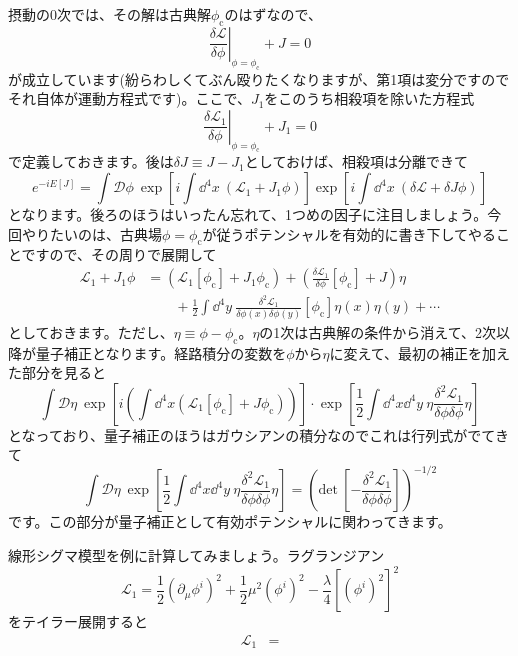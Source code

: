 \documentclass[unicode,a4paper,11pt]{ltjsarticle}
\theoremstyle{definition}
\begin{document}
摂動の0次では、その解は古典解$\phi_{\mathrm{c}}$のはずなので、
\begin{equation}
   \left.
   \frac{\delta\mathcal{L}}{\delta\phi}
   \right|_{\phi=\phi_{\mathrm{c}}}
   +
   J
   =
   0
\end{equation}
が成立しています(紛らわしくてぶん殴りたくなりますが、第1項は変分ですのでそれ自体が運動方程式です)。ここで、$J_{1}$をこのうち相殺項を除いた方程式
\begin{equation}
   \left.
   \frac{\delta\mathcal{L}_1}{\delta\phi}
   \right|_{\phi=\phi_{\mathrm{c}}}
   +
   J_{1}
   =
   0
\end{equation}
で定義しておきます。後は$\delta J\equiv J-J_{1}$としておけば、相殺項は分離できて
\begin{equation}
   e^{-i E[J]}
   =
   \int\mathcal{D}\phi\
   \exp
   \left[
   i\int\dd^4 x\
   (\mathcal{L}_{1}+J_{1}\phi)
   \right]
   \exp
   \left[
      i\int\dd^4 x\
      (\delta\mathcal{L}+\delta J\phi)
      \right]
\end{equation}
となります。後ろのほうはいったん忘れて、1つめの因子に注目しましょう。今回やりたいのは、古典場$\phi=\phi_{\mathrm{c}}$が従うポテンシャルを有効的に書き下してやることですので、その周りで展開して
\begin{align}
   \mathcal{L}_{1}+J_{1}\phi
    & =
   \left(
   \mathcal{L}_{1}[\phi_{\mathrm{c}}]+J_{1}\phi_{\mathrm{c}}
   \right)
   +
   \left(
   \frac{\delta\mathcal{L}_{1}}{\delta\phi}[\phi_{\mathrm{c}}]
   +
   J
   \right)\eta
   \nonumber
   \\
    & \qquad
   +
   \frac{1}{2}\int\dd^4 y\
   \frac{\delta^2 \mathcal{L}_1}{\delta\phi(x)\delta\phi(y)}[\phi_{\mathrm{c}}]\eta(x)\eta(y)
   +
   \cdots
\end{align}
としておきます。ただし、$\eta\equiv\phi-\phi_{\mathrm{c}}$。$\eta$の1次は古典解の条件から消えて、2次以降が量子補正となります。経路積分の変数を$\phi$から$\eta$に変えて、最初の補正を加えた部分を見ると
\begin{equation}
   \int\mathcal{D}\eta\ 
   \exp
   \left[  
      i
      \left(  
         \int\dd^4 x (\mathcal{L}_{1}[\phi_{\mathrm{c}}]+J\phi_{\mathrm{c}})
      \right)
   \right]
   \cdot
   \exp
   \left[  
      \frac{1}{2}
      \int\dd^4 x\dd^4 y\ 
      \eta\frac{\delta^2\mathcal{L}_{1}}{\delta\phi\delta\phi}\eta
   \right]
\end{equation}
となっており、量子補正のほうはガウシアンの積分なのでこれは行列式がでてきて
\begin{equation}
   \int\mathcal{D}\eta\    
   \exp
   \left[  
      \frac{1}{2}
      \int\dd^4 x\dd^4 y\ 
      \eta\frac{\delta^2\mathcal{L}_{1}}{\delta\phi\delta\phi}\eta
   \right]
   =
   \left(  
      \mathrm{det\ }
      \left[  
         -\frac{\delta^2\mathcal{L}_{1}}{\delta\phi\delta\phi}
      \right]
   \right)^{-1/2}
\end{equation}
です。この部分が量子補正として有効ポテンシャルに関わってきます。

線形シグマ模型を例に計算してみましょう。ラグランジアン
\begin{equation}
   \mathcal{L}_{1}
   =
   \frac{1}{2}(\partial_{\mu}\phi^{i})^2
   +
   \frac{1}{2}\mu^2 (\phi^{i})^2
   -
   \frac{\lambda}{4}[(\phi^{i})^2]^2
\end{equation}
をテイラー展開すると
\begin{align}
   \mathcal{L}_{1}
   &=
\end{align}
\end{document}

